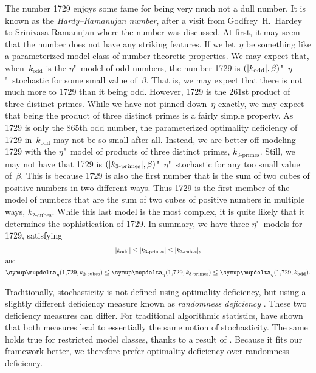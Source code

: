 \begin{example}
  The number \num{1729} enjoys some fame for being very much not a dull number.
  It is known as the \emph{Hardy--Ramanujan number}, after a visit from Godfrey~H.~Hardey to Srinivasa Ramanujan where the number was discussed.
  At first, it may seem that the number does not have any striking features.
  If we let~$\eta$ be something like a parameterized model class of number theoretic properties.
  We may expect that, when~$k_\text{odd}$ is the $\eta$"~model of odd numbers, the number \num{1729} is $({\lvert k_\text{odd}\rvert}, \beta)$"~$\eta$"~stochastic for some small value of~$\beta$.
  That is, we may expect that there is not much more to \num{1729} than it being odd.
  However, \num{1729} is the \num{261}st product of three distinct primes.
  While we have not pinned down~$\eta$ exactly, we may expect that being the product of three distinct primes is a fairly simple property.
  As \num{1729} is only the \num{865}th odd number, the parameterized optimality deficiency of \num{1729} in~$k_\text{odd}$ may not be so small after all.
  Instead, we are better off modeling \num{1729} with the $\eta$"~model of products of three distinct primes, $k_{3\text{-primes}}$.
  Still, we may not have that \num{1729} is $({\lvert k_{3\text{-primes}}\rvert}, \beta)$"~$\eta$"~stochastic for any too small value of~$\beta$.
  This is because \num{1729} is also the first number that is the sum of two cubes of positive numbers in two different ways.
  Thus \num{1729} is the first member of the model of numbers that are the sum of two cubes of positive numbers in multiple ways, $k_{2\text{-cubes}}$.
  While this last model is the most complex, it is quite likely that it determines the sophistication of \num{1729}.
  In summary, we have three $\eta$"~models for \num{1729}, satisfying
  \begin{gather*}
    \length{k_\text{odd}} \le \length{k_{3\text{-primes}}} \le \length{k_{2\text{-cubes}}}, \\
  \shortintertext{and}
    \updelta_\eta(\num{1729}, k_{2\text{-cubes}}) \le \updelta_\eta(\num{1729}, k_{3\text{-primes}}) \le \updelta_\eta(\num{1729}, k_\text{odd}).
  \end{gather*}
\end{example}

Traditionally, stochasticity is not defined using optimality deficiency, but using a slightly different deficiency measure known as \emph{randomness deficiency} \parencite{shen1983concept,li2008introduction}.
These two deficiency measures can differ.
For traditional algorithmic statistics, \textcite[][Theorem~2]{vereshchagin2017algorithmic} have shown that both measures lead to essentially the same notion of stochasticity.
The same holds true for restricted model classes, thanks to a result of \textcite{vereshchagin2010rate} \parencite[see also][]{vereshchagin2017algorithmic}.
Because it fits our framework better, we therefore prefer optimality deficiency over randomness deficiency.

